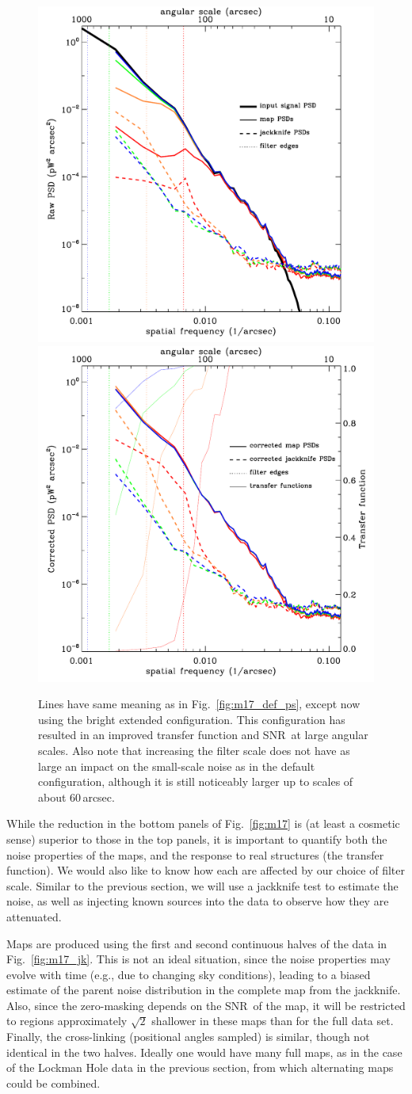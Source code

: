 \documentclass[useAMS,usenatbib,nofootinbib]{mn2e}
\newcommand{\snr}{SNR}
\begin{document}
\begin{figure}
\centering
\includegraphics[width=0.49\linewidth]{pspec_m17_bright_extended}
\includegraphics[width=0.49\linewidth]{cor_pspec_m17_bright_extended}
\caption{Lines have same meaning as in Fig.~\ref{fig:m17_def_ps},
except now using the bright extended configuration. This configuration
has resulted in an improved transfer function and \snr\ at large
angular scales. Also note that increasing the filter scale does not
have as large an impact on the small-scale noise as in the default
configuration, although it is still noticeably larger up to scales of
about 60\,arcsec.}
\label{fig:m17_be_ps}
\end{figure}

While the reduction in the bottom panels of Fig.~\ref{fig:m17} is (at
least a cosmetic sense) superior to those in the top panels, it is
important to quantify both the noise properties of the maps, and the
response to real structures (the transfer function). We would also
like to know how each are affected by our choice of filter scale.
Similar to the previous section, we will use a jackknife test to
estimate the noise, as well as injecting known sources into the data
to observe how they are attenuated.

Maps are produced using the first and second continuous halves of the
data in Fig.~\ref{fig:m17_jk}. This is not an ideal situation, since
the noise properties may evolve with time (e.g., due to changing sky
conditions), leading to a biased estimate of the parent noise
distribution in the complete map from the jackknife. Also, since the
zero-masking depends on the \snr\ of the map, it will be restricted to
regions approximately $\sqrt{2}$ shallower in these maps than for the
full data set. Finally, the cross-linking (positional angles sampled)
is similar, though not identical in the two halves. Ideally one would
have many full maps, as in the case of the Lockman Hole data in the
previous section, from which alternating maps could be combined.
\end{document}
